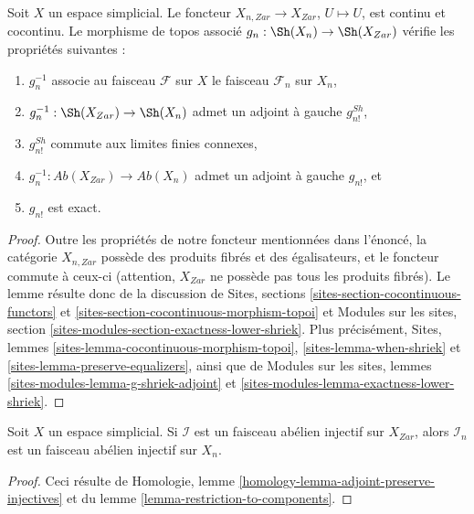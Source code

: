 \begin{lemma}
\label{lemma-restriction-to-components}
Soit $X$ un espace simplicial. Le foncteur
$X_{n, Zar} \to X_{Zar}$, $U \mapsto U$, est continu
et cocontinu. Le morphisme de topos associé
$g_n : \Sh(X_n) \to \Sh(X_{Zar})$ vérifie les propriétés suivantes :
\begin{enumerate}
\item $g_n^{-1}$ associe au faisceau $\mathcal{F}$ sur $X$
le faisceau $\mathcal{F}_n$ sur $X_n$,
\item $g_n^{-1} : \Sh(X_{Zar}) \to \Sh(X_n)$ admet un adjoint à gauche $g^{Sh}_{n!}$,
\item $g^{Sh}_{n!}$ commute aux limites finies connexes,
\item $g_n^{-1} : \textit{Ab}(X_{Zar}) \to \textit{Ab}(X_n)$
admet un adjoint à gauche $g_{n!}$, et
\item $g_{n!}$ est exact.
\end{enumerate}
\end{lemma}

\begin{proof}
Outre les propriétés de notre foncteur mentionnées dans l'énoncé,
la catégorie $X_{n, Zar}$ possède des produits fibrés et des égalisateurs,
et le foncteur commute à ceux-ci (attention, $X_{Zar}$ ne possède pas
tous les produits fibrés). Le lemme résulte donc de la discussion de
Sites, sections \ref{sites-section-cocontinuous-functors} et
\ref{sites-section-cocontinuous-morphism-topoi}
et
Modules sur les sites, section \ref{sites-modules-section-exactness-lower-shriek}.
Plus précisément,
Sites, lemmes \ref{sites-lemma-cocontinuous-morphism-topoi},
\ref{sites-lemma-when-shriek} et
\ref{sites-lemma-preserve-equalizers},
ainsi que de
Modules sur les sites, lemmes
\ref{sites-modules-lemma-g-shriek-adjoint} et
\ref{sites-modules-lemma-exactness-lower-shriek}.
\end{proof}

\begin{lemma}
\label{lemma-restriction-injective-to-component}
Soit $X$ un espace simplicial. Si $\mathcal{I}$ est un faisceau abélien
injectif sur $X_{Zar}$, alors $\mathcal{I}_n$ est un faisceau abélien injectif
sur $X_n$.
\end{lemma}

\begin{proof}
Ceci résulte de
Homologie, lemme \ref{homology-lemma-adjoint-preserve-injectives}
et du
lemme \ref{lemma-restriction-to-components}.
\end{proof}

